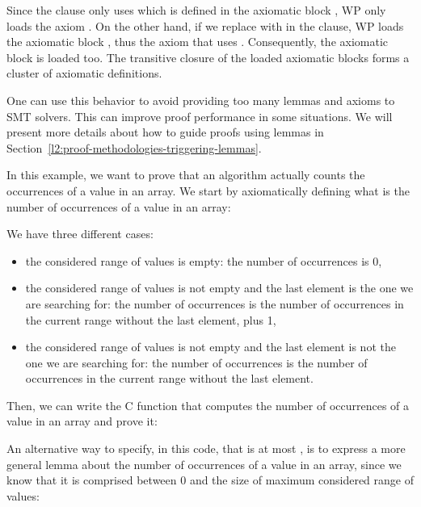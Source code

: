Since the  clause only uses  which is defined
in the axiomatic block , WP only loads the axiom .
On the other hand, if we replace  with  in the
 clause, WP loads the axiomatic block , thus
the axiom  that uses . Consequently, the axiomatic
block  is loaded too. The transitive closure of the loaded
axiomatic blocks forms a cluster of axiomatic definitions.


One can use this behavior to avoid providing too many lemmas and axioms to SMT
solvers. This can improve proof performance in some situations. We will present
more details about how to guide proofs using lemmas in
Section~\ref{l2:proof-methodologies-triggering-lemmas}.




In this example, we want to prove that an algorithm actually counts the
occurrences of a value in an array. We start by axiomatically defining
what is the number of occurrences of a value in an array:




We have three different cases:
\begin{itemize}
\item
  the considered range of values is empty: the number of occurrences is
  0,
\item
  the considered range of values is not empty and the last element is
  the one we are searching for: the number of occurrences is the number of
  occurrences in the current range without the last element, plus 1,
\item
  the considered range of values is not empty and the last element is
  not the one we are searching for: the number of occurrences is the number
  of occurrences in the current range without the last element.
\end{itemize}
Then, we can write the C function that computes the number of
occurrences of a value in an array and prove it:




An alternative way to specify, in this code, that  is at
most , is to express a more general lemma about the number of
occurrences of a value in an array, since we know that it is
comprised between 0 and the size of maximum considered range of values:


